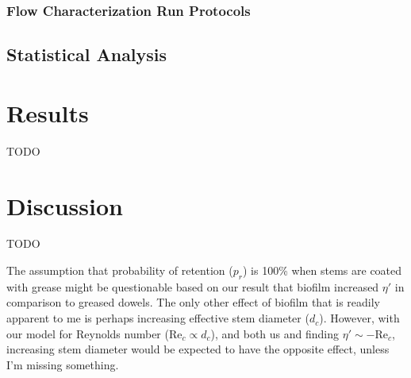 \documentclass[parskip=full-]{scrreprt}
\newcommand\Rey{\mathrm{Re}}
\begin{document}
\subsection{Flow Characterization Run Protocols}

\section{Statistical Analysis}

\chapter{Results}

TODO

\chapter{Discussion}

TODO

The assumption that probability of retention (\(p_r\)) is 100\% when stems are coated with grease might be questionable based on our result that biofilm increased \(\eta\prime\) in comparison to greased dowels. The only other effect of biofilm that is readily apparent to me is perhaps increasing effective stem diameter (\(d_c\)). However, with our model for Reynolds number (\(\Rey_c \propto d_c\)), and both us and \citet{Fauria_2015} finding \(\eta\prime \sim -\Rey_c\), increasing stem diameter would be expected to have the opposite effect, unless I'm missing something.



\end{document}
